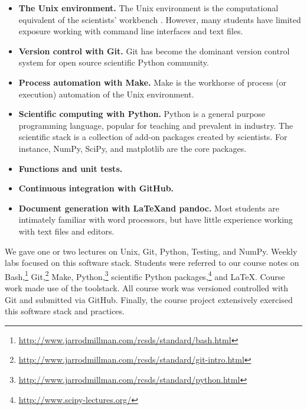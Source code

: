 \begin{itemize}
\item \textbf{The Unix environment.}
The Unix environment is the computational equivalent of the scientists'
workbench \citep{preeyanon2014reproducible}.
However, many students have limited exposure working with
command line interfaces and text files.

\item \textbf{Version control with Git.}
Git has become the dominant version control system for open source scientific
Python community.

\item \textbf{Process automation with Make.}
Make is the workhorse of process (or execution) automation of the Unix environment.

\item \textbf{Scientific computing with Python.}
Python is a general purpose programming language,
popular for teaching and prevalent in industry.
The scientific stack is a collection of add-on packages created by scientists.
For instance, NumPy, SciPy, and matplotlib are the core packages.

\item \textbf{Functions and unit tests.}


\item \textbf{Continuous integration with GitHub.}

\item \textbf{Document generation with \LaTeX and pandoc.}
Most students are intimately familiar with word processors, but have little experience
working with text files and editors.

\end{itemize}

We gave one or two lectures on Unix, Git, Python, Testing, and NumPy.
Weekly labs focused on this software stack.
Students were referred to our course notes on
Bash,\footnote{\url{http://www.jarrodmillman.com/rcsds/standard/bash.html}}
Git,\footnote{\url{http://www.jarrodmillman.com/rcsds/standard/git-intro.html}}
Make,
Python,\footnote{\url{http://www.jarrodmillman.com/rcsds/standard/python.html}}
scientific Python packages,\footnote{\url{http://www.scipy-lectures.org/}}
and \LaTeX.
Course work made use of the toolstack.
All course work was versioned controlled with Git
and submitted via GitHub.
Finally, the course project extensively exercised this software stack
and practices.

